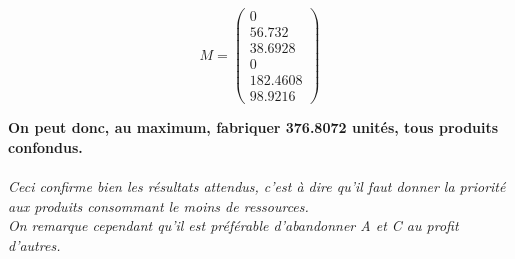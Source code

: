 \begin{displaymath}
M = \left(
\begin{array}{c}
0\\
56.732\\
38.6928\\
0\\
182.4608\\
98.9216 
\end{array}
\right)
\end{displaymath}
\begin{center}
\textbf{On peut donc, au maximum, fabriquer 376.8072 unités, tous produits
confondus.}\\
~\\
\textsl{Ceci confirme bien les résultats attendus, c'est à dire
qu'il faut donner la priorité aux produits consommant le moins de ressources.\\
On remarque cependant qu'il est préférable d'abandonner \textsl{A} et \textsl{C}
au profit d'autres.}
\end{center}

